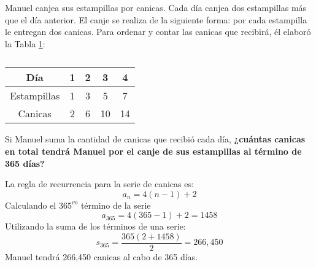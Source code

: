 Manuel canjea sus estampillas por canicas. Cada día canjea dos estampillas más
que el día anterior.
El canje se realiza de la siguiente forma: por cada estampilla le entregan dos
canicas.
Para ordenar y contar las canicas que recibirá, él elaboró la Tabla
\ref{tab:estampillas}:

\begin{table}[H]
    \centering
    \caption{}
    \label{tab:estampillas}
    \begin{tabular}{c|c|c|c|c}
        Día         & 1 & 2 & 3  & 4  \\ \hline
        Estampillas & 1 & 3 & 5  & 7  \\ \hline
        Canicas     & 2 & 6 & 10 & 14
    \end{tabular}
\end{table}

Si Manuel suma la cantidad de canicas que recibió cada día,
\textbf{¿cuántas canicas en total tendrá Manuel por el canje de sus estampillas
    al término de 365 días?}\\

\begin{solutionbox}{6.5cm}
    La regla de recurrencia para la serie de canicas es:
    \[a_n=4(n-1)+2\]
    Calculando el $365^{vo}$ término de la serie
    \[a_{365}=4(365-1)+2=1458\]
    Utilizando la suma de los términos de una serie:
    \[s_{365}=\dfrac{365(2+1458)}{2}=266,450\]
    Manuel tendrá 266,450 canicas al cabo de 365 días.
\end{solutionbox}